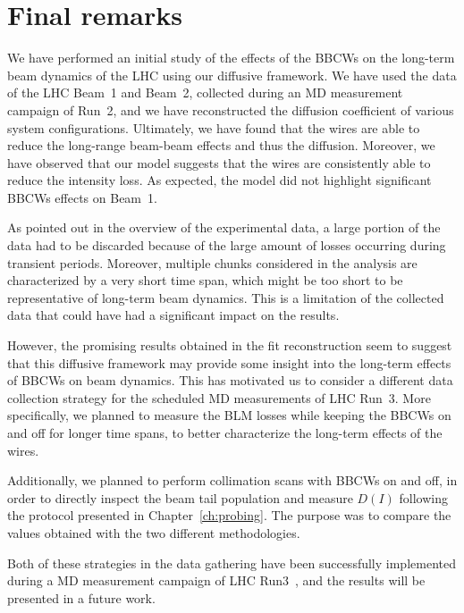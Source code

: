 
\section{Final remarks}\label{sec:5:conclusions}

We have performed an initial study of the effects of the BBCWs on the long-term beam dynamics of the LHC using our diffusive framework. We have used the data of the LHC Beam~1 and Beam~2, collected during an MD measurement campaign of Run~2, and we have reconstructed the diffusion coefficient of various system configurations. Ultimately, we have found that the wires are able to reduce the long-range beam-beam effects and thus the diffusion. Moreover, we have observed that our model suggests that the wires are consistently able to reduce the intensity loss. As expected, the model did not highlight significant BBCWs effects on Beam~1.

As pointed out in the overview of the experimental data, a large portion of the data had to be discarded because of the large amount of losses occurring during transient periods. Moreover, multiple chunks considered in the analysis are characterized by a very short time span, which might be too short to be representative of long-term beam dynamics. This is a limitation of the collected data that could have had a significant impact on the results.

However, the promising results obtained in the fit reconstruction seem to suggest that this diffusive framework may provide some insight into the long-term effects of BBCWs on beam dynamics. This has motivated us to consider a different data collection strategy for the scheduled MD measurements of LHC Run~3. More specifically, we planned to measure the BLM losses while keeping the BBCWs on and off for longer time spans, to better characterize the long-term effects of the wires.

Additionally, we planned to perform collimation scans with BBCWs on and off, in order to directly inspect the beam tail population and measure $D(I)$ following the protocol presented in Chapter~\ref{ch:probing}. The purpose was to compare the values obtained with the two different methodologies.

Both of these strategies in the data gathering have been successfully implemented during a MD measurement campaign of LHC Run3~\cite{MDrun3wires}, and the results will be presented in a future work.